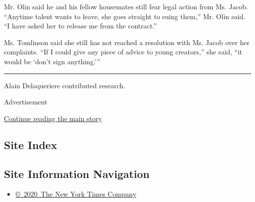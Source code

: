 Mr. Olin said he and his fellow housemates still fear legal action from
Ms. Jacob. ``Anytime talent wants to leave, she goes straight to suing
them,'' Mr. Olin said. ``I have asked her to release me from the
contract.''

Ms. Tomlinson said she still has not reached a resolution with Ms. Jacob
over her complaints. ``If I could give any piece of advice to young
creators,'' she said, ``it would be `don't sign anything.'''

\begin{center}\rule{0.5\linewidth}{\linethickness}\end{center}

Alain Delaqueriere contributed research.

Advertisement

\protect\hyperlink{after-bottom}{Continue reading the main story}

\hypertarget{site-index}{%
\subsection{Site Index}\label{site-index}}

\hypertarget{site-information-navigation}{%
\subsection{Site Information
Navigation}\label{site-information-navigation}}

\begin{itemize}
\tightlist
\item
  \href{https://help.nytimes3xbfgragh.onion/hc/en-us/articles/115014792127-Copyright-notice}{©~2020~The
  New York Times Company}
\end{itemize}

